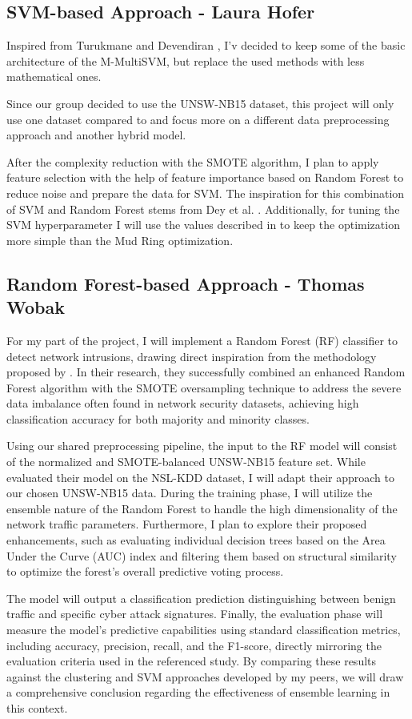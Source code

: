 \subsection{SVM-based Approach - Laura Hofer}
Inspired from Turukmane and Devendiran \cite{SVM}, I'v decided to keep some of the basic architecture of the M-MultiSVM, but replace the used methods with less mathematical ones.

\nextparagraph
Since our group decided to use the UNSW-NB15 \cite{UNSW} dataset, this project will only use one dataset compared to \cite{SVM} and focus more on a different data preprocessing  approach and another hybrid model.

\nextparagraph
After the complexity reduction with the SMOTE algorithm, I plan to apply feature selection with the help of feature importance based on Random Forest to reduce noise and prepare the data for SVM. The inspiration for this combination of SVM and Random Forest stems from Dey et al. \cite{dey2023new}. Additionally, for tuning the SVM hyperparameter I will use the values described in \cite{dey2023new} to keep the optimization more simple than the Mud Ring optimization.

\subsection{Random Forest-based Approach - Thomas Wobak}
For my part of the project, I will implement a Random Forest (RF) classifier to detect network intrusions, drawing direct inspiration from the methodology proposed by \cite{intrusion_detection_combined_random_forest}. In their research, they successfully combined an enhanced Random Forest algorithm with the SMOTE oversampling technique to address the severe data imbalance often found in network security datasets, achieving high classification accuracy for both majority and minority classes.

\nextparagraph
Using our shared preprocessing pipeline, the input to the RF model will consist of the normalized and SMOTE-balanced UNSW-NB15 feature set. While \cite{wu2022intrusion} evaluated their model on the NSL-KDD dataset, I will adapt their approach to our chosen UNSW-NB15 data. During the training phase, I will utilize the ensemble nature of the Random Forest to handle the high dimensionality of the network traffic parameters. Furthermore, I plan to explore their proposed enhancements, such as evaluating individual decision trees based on the Area Under the Curve (AUC) index and filtering them based on structural similarity to optimize the forest's overall predictive voting process.

\nextparagraph
The model will output a classification prediction distinguishing between benign traffic and specific cyber attack signatures. Finally, the evaluation phase will measure the model's predictive capabilities using standard classification metrics, including accuracy, precision, recall, and the F1-score, directly mirroring the evaluation criteria used in the referenced study. By comparing these results against the clustering and SVM approaches developed by my peers, we will draw a comprehensive conclusion regarding the effectiveness of ensemble learning in this context.
